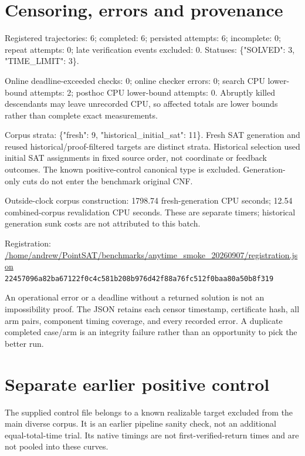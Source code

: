 \documentclass[10pt,a4paper]{article}
\begin{document}
\section*{Censoring, errors and provenance}

Registered trajectories: 6; completed: 6; persisted attempts: 6; incomplete: 0; repeat attempts: 0; late verification events excluded: 0. Statuses: \{"SOLVED": 3, "TIME\_LIMIT": 3\}.

Online deadline-exceeded checks: 0; online checker errors: 0; search CPU lower-bound attempts: 2; posthoc CPU lower-bound attempts: 0. Abruptly killed descendants may leave unrecorded CPU, so affected totals are lower bounds rather than complete exact measurements.

Corpus strata: \{"fresh": 9, "historical\_initial\_sat": 11\}. Fresh SAT generation and reused historical/proof-filtered targets are distinct strata. Historical selection used initial SAT assignments in fixed source order, not coordinate or feedback outcomes. The known positive-control canonical type is excluded. Generation-only cuts do not enter the benchmark original CNF.

Outside-clock corpus construction: 1798.74 fresh-generation CPU seconds; 12.54 combined-corpus revalidation CPU seconds. These are separate timers; historical generation sunk costs are not attributed to this batch.

{\small Registration: \url{/home/andrew/PointSAT/benchmarks/anytime_smoke_20260907/registration.json}}\\{\footnotesize\texttt{22457096a82ba67122f0c4c581b208b976d42f88a76fc512f0baa80a50b8f319}}

An operational error or a deadline without a returned solution is not an impossibility proof. The JSON retains each censor timestamp, certificate hash, all arm pairs, component timing coverage, and every recorded error. A duplicate completed case/arm is an integrity failure rather than an opportunity to pick the better run.

\section*{Separate earlier positive control}

The supplied control file belongs to a known realizable target excluded from the main diverse corpus. It is an earlier pipeline sanity check, not an additional equal-total-time trial. Its native timings are not first-verified-return times and are not pooled into these curves.
\end{document}
